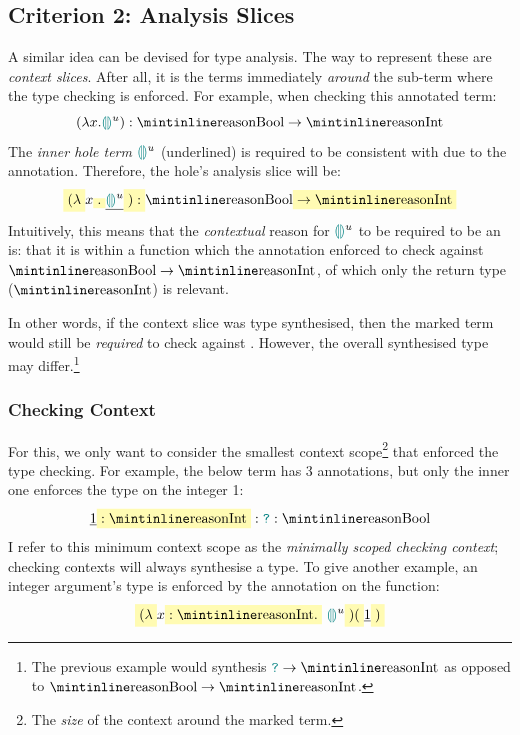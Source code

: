 \subsection{Criterion 2: Analysis Slices}\label{sec:AnalysisSlices}
A similar idea can be devised for type analysis. The way to represent these are \textit{context slices}. After all, it is the terms immediately \textit{around} the sub-term where the type checking is enforced. For example, when checking this annotated term:
\[(\lambda x. \hole^u) : \code{Bool} \to \code{Int}\]
The \textit{inner hole term} ${\color{teal}\llparenthesis}  {\color{teal}\rrparenthesis}^u$ (underlined) is required to be consistent with  due to the annotation. Therefore, the hole's analysis slice will be:
\[\hlcmaths[yellow!30]{(\lambda} x\hlcmaths[yellow!30]{.} \underline{\hole^u} \hlcmaths[yellow!30]{) : } \code{Bool} \hlcmaths[yellow!30]{\to \code{Int}}\]
Intuitively, this means that the \textit{contextual} reason for ${\color{teal}\llparenthesis}  {\color{teal}\rrparenthesis}^u$ to be required to be an  is: that it is within a function which the annotation enforced to check against $\code{Bool} \to \code{Int}$, of which only the return type ($\code{Int}$) is relevant.

In other words, if the context slice was type synthesised, then the marked term would still be \textit{required} to check against . However, the overall synthesised type may differ.\footnote{The previous example would synthesis $\dyn \to \code{Int}$ as opposed to $\code{Bool} \to \code{Int}$.}


\subsubsection{Checking Context}
For this, we only want to consider the smallest context scope\footnote{The \textit{size} of the context around the marked term.} that enforced the type checking. For example, the below term has 3 annotations, but only the inner one enforces the  type on the integer 1:
\[\underline{1} \hlcmaths[yellow!30]{: \code{Int}} : \dyn : \code{Bool}\]
I refer to this minimum context scope as the \textit{minimally scoped checking context}; checking contexts will always synthesise a type. To give another example, an integer argument's type is enforced by the annotation on the function:
\[\hlcmaths[yellow!30]{(\lambda} x \hlcmaths[yellow!30]{: \code{Int}.}\ \hole^u\hlcmaths[yellow!30]{)(}\underline{1}\hlcmaths[yellow!30]{)}\]


